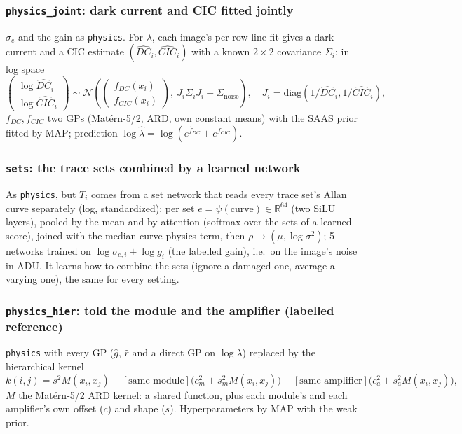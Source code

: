 \subsubsection{\texttt{physics\_joint}: dark current and CIC fitted jointly}
$\sigma_e$ and the gain as \texttt{physics}. For $\lambda$, each image's per-row line fit gives a dark-current and a
CIC estimate $(\widehat{DC}_i,\widehat{CIC}_i)$ with a known $2\times2$ covariance $\Sigma_i$; in log space
\[
\begin{pmatrix}\log\widehat{DC}_i\\ \log\widehat{CIC}_i\end{pmatrix}\sim\mathcal N\left(\begin{pmatrix}f_{DC}(x_i)\\ f_{CIC}(x_i)\end{pmatrix},\
J_i\Sigma_iJ_i+\Sigma_{\text{noise}}\right),\quad J_i=\mathrm{diag}(1/\widehat{DC}_i,1/\widehat{CIC}_i),
\]
$f_{DC},f_{CIC}$ two GPs (Mat\'ern-5/2, ARD, own constant means) with the SAAS prior fitted by MAP; prediction
$\log\hat\lambda=\log(e^{\hat f_{DC}}+e^{\hat f_{CIC}})$.


\subsubsection{\texttt{sets}: the trace sets combined by a learned network}
As \texttt{physics}, but $T_i$ comes from a set network that reads every trace set's Allan curve separately (log,
standardized): per set $e=\psi(\text{curve})\in\mathbb R^{64}$ (two SiLU layers), pooled by the mean and
by attention (softmax over the sets of a learned score), joined with the median-curve physics term, then
$\rho\to(\mu,\log\sigma^2)$; 5 networks trained on $\log\sigma_{e,i}+\log g_i$ (the labelled gain), i.e.\ on the image's
noise in ADU. It learns how to combine the sets (ignore a damaged one, average a varying one), the same for every
setting.


\subsubsection{\texttt{physics\_hier}: told the module and the amplifier (labelled reference)}
\texttt{physics} with every GP ($\hat g$, $\hat r$ and a direct GP on $\log\lambda$) replaced by the hierarchical kernel
\[
k(i,j)=s^2M(x_i,x_j)+[\text{same module}]\big(c_m^2+s_m^2M(x_i,x_j)\big)+[\text{same amplifier}]\big(c_a^2+s_a^2M(x_i,x_j)\big),
\]
$M$ the Mat\'ern-5/2 ARD kernel: a shared function, plus each module's and each amplifier's own offset ($c$) and shape
($s$). Hyperparameters by MAP with the weak prior.

